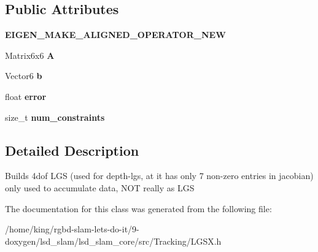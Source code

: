 \subsection*{Public Attributes}
\begin{DoxyCompactItemize}
\item 
\hypertarget{classlsd__slam_1_1_l_g_s6_a0c72470af8948ecb5b0d7e9ff5a1c5bc}{{\bfseries E\-I\-G\-E\-N\-\_\-\-M\-A\-K\-E\-\_\-\-A\-L\-I\-G\-N\-E\-D\-\_\-\-O\-P\-E\-R\-A\-T\-O\-R\-\_\-\-N\-E\-W}}\label{classlsd__slam_1_1_l_g_s6_a0c72470af8948ecb5b0d7e9ff5a1c5bc}

\item 
\hypertarget{classlsd__slam_1_1_l_g_s6_a2d14c1a984450273bb01a0941fbf5ada}{Matrix6x6 {\bfseries A}}\label{classlsd__slam_1_1_l_g_s6_a2d14c1a984450273bb01a0941fbf5ada}

\item 
\hypertarget{classlsd__slam_1_1_l_g_s6_ad3613ae9cd1f502695d732b6d9b13365}{Vector6 {\bfseries b}}\label{classlsd__slam_1_1_l_g_s6_ad3613ae9cd1f502695d732b6d9b13365}

\item 
\hypertarget{classlsd__slam_1_1_l_g_s6_ae623a9c4889b5d0be7da81c809c3938c}{float {\bfseries error}}\label{classlsd__slam_1_1_l_g_s6_ae623a9c4889b5d0be7da81c809c3938c}

\item 
\hypertarget{classlsd__slam_1_1_l_g_s6_a354b8d5d6d95cdd517c5e749581d14cf}{size\-\_\-t {\bfseries num\-\_\-constraints}}\label{classlsd__slam_1_1_l_g_s6_a354b8d5d6d95cdd517c5e749581d14cf}

\end{DoxyCompactItemize}


\subsection{Detailed Description}
Builds 4dof L\-G\-S (used for depth-\/lgs, at it has only 7 non-\/zero entries in jacobian) only used to accumulate data, N\-O\-T really as L\-G\-S 

The documentation for this class was generated from the following file\-:\begin{DoxyCompactItemize}
\item 
/home/king/rgbd-\/slam-\/lets-\/do-\/it/9-\/doxygen/lsd\-\_\-slam/lsd\-\_\-slam\-\_\-core/src/\-Tracking/L\-G\-S\-X.\-h\end{DoxyCompactItemize}
